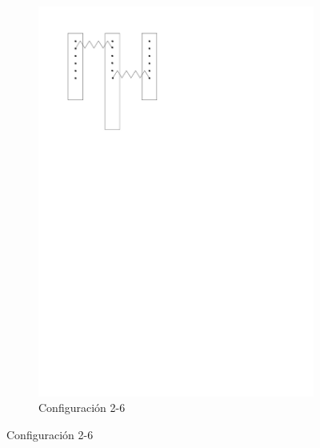 \begin{figure}[htbp!]
\begin{subfigure}[b]{0.3\textwidth}
		\includegraphics[width=\linewidth]{./Figures/26.pdf}
		\caption{Configuración 2-6}
		\label{fig:conf-2-6}
	\end{subfigure}

	\vspace{0.5cm}


\end{figure}
